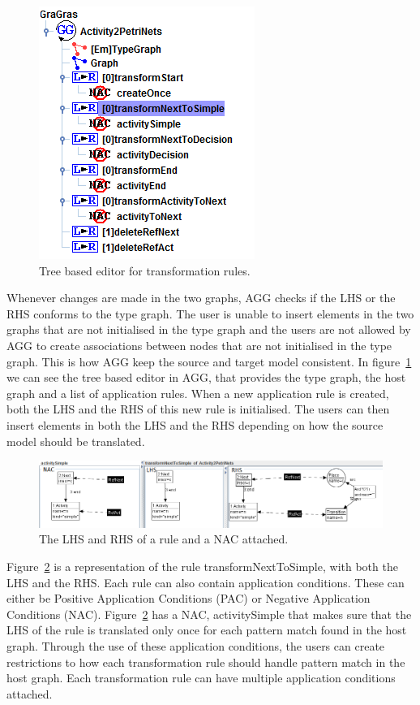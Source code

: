 \begin{figure}[H]
	\centering
	\includegraphics[scale=0.7]{figures/AGGTreeBasedEditor.png}
	\caption[Tree based editor in AGG]
	{Tree based editor for transformation rules.}
	\label{fig:AGGTreeBasedEditor}
\end{figure}

Whenever changes are made in the two graphs, AGG checks if the LHS or the RHS
conforms to the type graph. The user is unable to insert elements in the two
graphs that are not initialised in the type graph and the users are not allowed
by AGG to create associations between nodes that are not initialised in the type
graph. This is how AGG keep the source and target model consistent. In
figure~\ref{fig:AGGTreeBasedEditor} we can see the tree based editor in AGG,
that provides the type graph, the host graph and a list of application rules.
When a new application rule is created, both the LHS and the RHS of this new
rule is initialised. The users can then insert elements in both the LHS and the
RHS depending on how the source model should be translated. 

\begin{figure}[H]
	\centering
	\includegraphics[scale=0.5]{figures/LHSvsRHSAGG.png}
	\caption[Representation of a rule in AGG]
	{The LHS and RHS of a rule and a NAC attached.}
	\label{fig:LHSvsRHSAGG}
\end{figure}

Figure~\ref{fig:LHSvsRHSAGG} is a representation of the rule
transformNextToSimple, with both the LHS and the RHS. Each rule can also
contain application conditions. These can either be Positive Application
Conditions (PAC) or Negative Application Conditions (NAC).
Figure~\ref{fig:LHSvsRHSAGG} has a NAC, activitySimple that makes sure that the
LHS of the rule is translated only once for each pattern match found in the
host graph. Through the use of these application conditions, the users can
create restrictions to how each transformation rule should handle pattern match
in the host graph. Each transformation rule can have multiple application
conditions attached.

